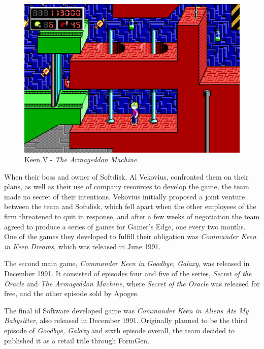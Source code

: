 \documentclass[book.tex]{subfiles}
\begin{document}
\begin{figure}[H]
  \centering
  \includegraphics[width=.95\textwidth]{screenshots_300dpi/keen2_2.png}
  \caption*{Keen V - \textit{The Armageddon Machine.}}
\end{figure}


\par
When their boss and owner of Softdisk, Al Vekovius, confronted them on their plans, as well as their use of company resources to develop the game, the team made no secret of their intentions. Vekovius initially proposed a joint venture between the team and Softdisk, which fell apart when the other employees of the firm threatened to quit in response, and after a few weeks of negotiation the team agreed to produce a series of games for Gamer's Edge, one every two months. One of the games they developed to fulfill their obligation was \textit{Commander Keen in Keen Dreams}, which was released in June 1991.\\

\par
The second main game, \textit{Commander Keen in Goodbye, Galaxy}, was released in December 1991. It consisted of episodes four and five of the series, \textit{Secret of the Oracle} and \textit{The Armageddon Machine}, where \textit{Secret of the Oracle} was released for free, and the other episode sold by Apogee.\\

\par
The final id Software developed game was \textit{Commander Keen in Aliens Ate My Babysitter}, also released in December 1991. Originally planned to be the third episode of \textit{Goodbye, Galaxy} and sixth episode overall, the team decided to published it as a retail title through FormGen.\\
\end{document}
